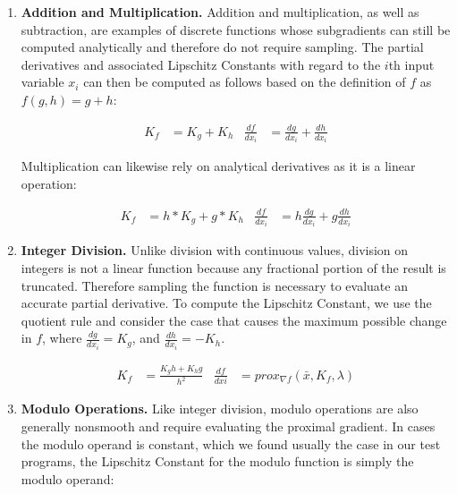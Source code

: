 \begin{enumerate}
  \item \textbf{Addition and Multiplication.} Addition and multiplication, as well as subtraction, are examples of discrete functions whose subgradients can still be computed analytically and therefore do not require sampling. The partial derivatives and associated Lipschitz Constants with regard to the $i$th input variable $x_i$ can then be computed as follows based on the definition of $f$ as $f\left(g, h\right) = g+h$:

\vspace{-10pt}\begin{align*}
  K_f &= K_{g} + K_{h} &\tfrac{df}{dx_i} &= \tfrac{dg}{dx_i} + \tfrac{dh}{dx_i}
\end{align*}

Multiplication can likewise rely on analytical derivatives as it is a linear operation:

\vspace{-10pt}\begin{align*}
  K_f &= h*K_{g} + g*K_{h} & \frac{df}{dx_i} &= h\frac{dg}{dx_i} + g\frac{dh}{dx_i}
\end{align*}



\item \textbf{Integer Division.} Unlike division with continuous values, division on integers is not a linear function because any fractional portion of the result is truncated. Therefore sampling the function is necessary to evaluate an accurate partial derivative. To compute the Lipschitz Constant, we use the quotient rule and consider the case that causes the maximum possible change in $f$, where $\tfrac{dg}{dx_i} = K_g$, and $\tfrac{dh}{dx_i} = -K_h$.

\vspace{-10pt}\begin{align*}
  K_f &= \frac{K_g h + K_h g}{h^2} & 
  \frac{df}{dxi} &= prox_{\nabla f}\left(\bar{x}, K_f, \lambda\right)
\end{align*}

\item \textbf{Modulo Operations.} Like integer division, modulo operations are also generally nonsmooth and require evaluating the proximal gradient. In cases the modulo operand is constant, which we found usually the case in our test programs, the Lipschitz Constant for the modulo function is simply the modulo operand:


\end{enumerate}
